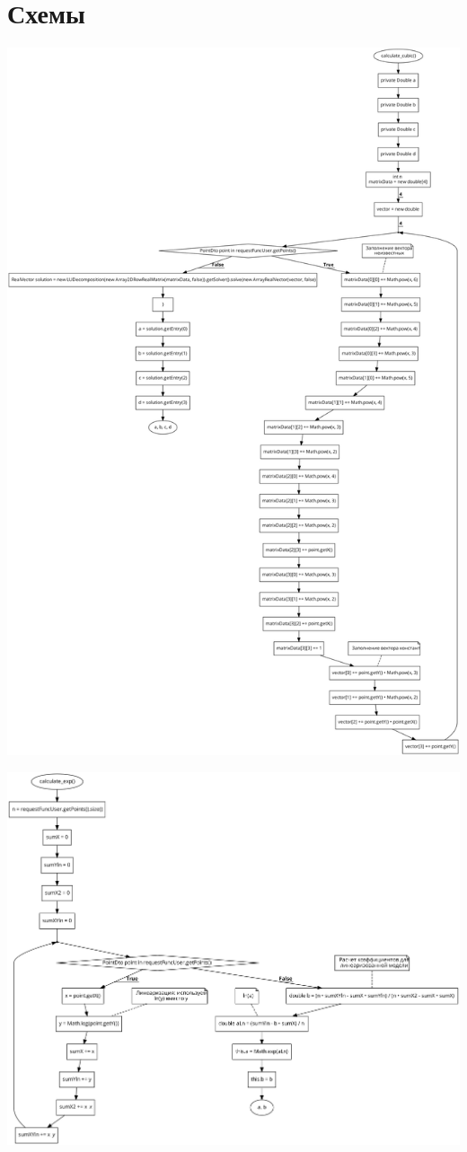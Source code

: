 \documentclass{article}
\begin{document}
\section{Схемы}
\begin{center}
    \includegraphics[width=.7\textwidth]{cubic_scheme.png}
\end{center}
\begin{center}
    \includegraphics[width=.7\textwidth]{exp_scheme.png}
\end{center}
\end{document}
